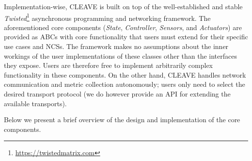 Implementation-wise, \ac{CLEAVE} is built on top of the well-established and stable \emph{Twisted}\footnote{\url{https://twistedmatrix.com}} asynchronous programming and networking framework.
The aforementioned core components (\emph{State}, \emph{Controller}, \emph{Sensors}, and \emph{Actuators}) are provided as \acp{ABC} with core functionality that users must extend for their specific use cases and \acp{NCS}.
The framework makes no assumptions about the inner workings of the user implementations of these classes other than the interfaces they expose.
Users are therefore free to implement arbitrarily complex functionality in these components.
On the other hand, \ac{CLEAVE} handles network communication and metric collection autonomously; users only need to select the desired transport protocol (we do however provide an \ac{API} for extending the available transports).

Below we present a brief overview of the design and implementation of the core components.

